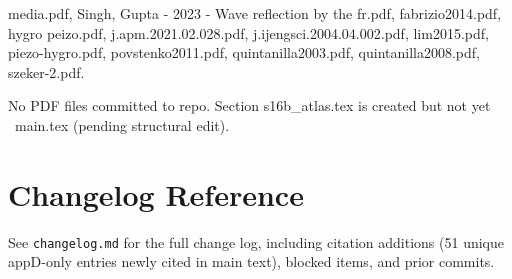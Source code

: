 \documentclass[12pt,a4paper]{article}
\begin{document}
media.pdf, Singh, Gupta - 2023 - Wave reflection by the fr.pdf, fabrizio2014.pdf, hygro peizo.pdf, j.apm.2021.02.028.pdf, j.ijengsci.2004.04.002.pdf, lim2015.pdf, piezo-hygro.pdf, povstenko2011.pdf, quintanilla2003.pdf, quintanilla2008.pdf, szeker-2.pdf.

No PDF files committed to repo. Section s16b\_atlas.tex is created but not yet \ main.tex (pending structural edit).

\section*{Changelog Reference}

See {\tt changelog.md} for the full change log, including citation additions (51 unique appD-only entries newly cited in main text), blocked items, and prior commits.
\end{document}
